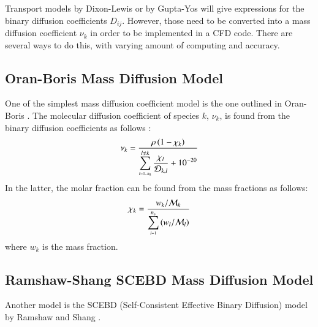 \documentclass{warpdoc}
\newcommand{\rhos}{\rho}
\newcommand{\ns}{{{n}_{\rm s}}}
\newcommand{\mfa}{\scriptscriptstyle}
\newcommand{\mfd}{\displaystyle}
\begin{document}
Transport models by Dixon-Lewis or by Gupta-Yos will give expressions for the binary diffusion coefficients $D_{ij}$. However, those need to be converted into a mass diffusion coefficient $\nu_k$ in order to be implemented in a CFD code. There are several ways to do this, with varying amount of computing and accuracy.

\subsection{Oran-Boris Mass Diffusion Model}

One of the simplest mass diffusion coefficient model is the one outlined in Oran-Boris \cite{pces:1981:oran}.
The molecular diffusion coefficient of species $k$, $\nu_k$,
is found from the binary diffusion coefficients as follows \cite[Eq.\ (6.15)]{pces:1981:oran}:
%
\begin{equation}
\mfd\nu_k= \frac{\rhos \left( 1 - {\chi}_k \right)}
            {\mfd\sum_{\mfa l=1..\ns}^{l \neq k} \frac{{\chi}_l}{{\cal D}_{k,l}} +10^{-20}   }
\label{eqn:moldiff-nu}
\end{equation}
%
In the latter, the molar fraction can be found from the mass fractions as follows:
%
\begin{equation}
{\chi}_k= \mfd\frac{w_k / {\cal M}_k}
              {\mfd\sum_{\mfa l=1}^{\ns} \left( w_l / {\cal M}_l \right)}
\end{equation}
%
where $w_k$ is the mass fraction. 

\subsection{Ramshaw-Shang SCEBD Mass Diffusion Model}

Another model is the SCEBD (Self-Consistent Effective Binary Diffusion) model by Ramshaw and Shang \cite{jnet:1996:ramshaw}.
\end{document}
